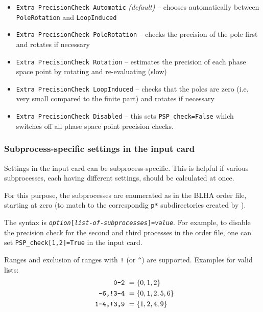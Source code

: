 \begin{itemize}
	\item \texttt{Extra PrecisionCheck Automatic} \textit{(default)} -- chooses automatically between \texttt{PoleRotation} and \texttt{LoopInduced}
	\item \texttt{Extra PrecisionCheck PoleRotation} -- checks the precision of the pole first and rotates if necessary
	\item \texttt{Extra PrecisionCheck Rotation} -- estimates the precision of each phase space point by rotating and re-evaluating (slow)
	\item \texttt{Extra PrecisionCheck LoopInduced} -- checks that the poles are zero (i.e. very small compared to the finite part) and rotates if necessary
	\item \texttt{Extra PrecisionCheck Disabled}  -- this sets \texttt{PSP\_check=False} which switches off all phase space point precision checks.
\end{itemize}


\subsubsection{Subprocess-specific settings in the \gosam{} input card}
Settings in the \gosam{} input card can be subprocess-specific.
This is helpful if various subprocesses, each having different settings, should be calculated at once.

For this purpose, the subprocesses are enumerated as in the BLHA order file, starting at zero (to match to the
correspondig \texttt{p*} subdirectories created by \gosam{}).\\

The syntax is \texttt{\textit{option}[\textit{list-of-subprocesses}]=\textit{value}}.
For example, to disable the precision check 
for the second and third processes in the order file,
one can set \texttt{PSP\_check[1,2]=True} in the input card.

Ranges and exclusion of ranges with \texttt{!} (or \texttt{\^}) are supported.
Examples for valid lists:
\begin{align*}
    \text{\texttt{0-2}         }     &= \{0,1,2\} \\
    \text{\texttt{-6,!3-4}         }  &   = \{0,1,2,5,6\} \\
    \text{\texttt{ 1-4,!3,9}       }   &   = \{1,2,4,9\}
\end{align*}

